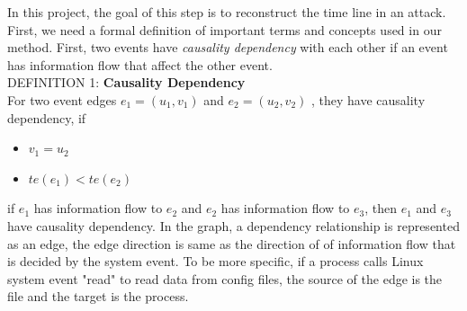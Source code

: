 {In this project, the goal of this step is to reconstruct the time line in an attack. First, we need a formal definition of important terms and concepts used in our method.
First, two events have \textit{causality dependency} with each other if an event has information flow that affect the other event.\\
DEFINITION 1: \textbf{Causality Dependency} \\
\indent For two event edges $e_1 = \mathit{(u_1, v_1)} $ and $e_2 = \mathit{(u_2, v_2)} $ , they have causality dependency, if
\begin{itemize}[noitemsep]
	\item $v_1 = u_2 $
	\item $te\mathit{(e_1)} < te\mathit{(e_2)}$
\end{itemize}
if $e_1$ has information flow to $e_2$ and $e_2$ has information flow to $e_3$, then $e_1$ and $e_3$ have causality dependency. In the graph, a dependency relationship is represented as an edge, the edge direction is same as the direction of of information flow that is decided by the system event. To be more specific, if a process calls Linux system event "read" to read data from config files, the source of the edge is the file and the target is the process.
}


